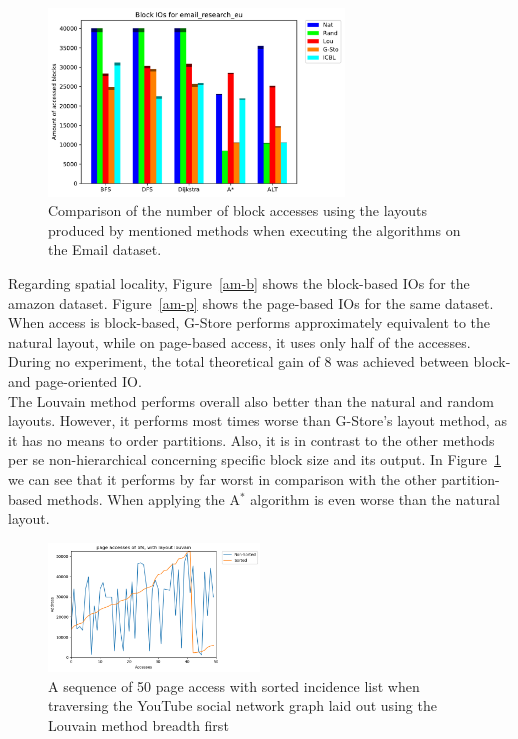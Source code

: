     \begin{figure}[htp]
        \begin{center}
            \includegraphics[keepaspectratio,width=0.7\textwidth]{img/07-eval/email_research_eu_Block_unsorted_io_comparison.pdf}
        \end{center}
        \caption{Comparison of the number of block accesses using the layouts produced by mentioned methods when executing the algorithms on the Email dataset.} 
        \label{email-block}
    \end{figure}
    
    Regarding spatial locality, Figure~\ref{am-b} shows the block-based IOs for the amazon dataset. Figure~\ref{am-p} shows the page-based IOs for the same dataset. When access is block-based, G-Store performs approximately equivalent to the natural layout, while on page-based access, it uses only half of the accesses. During no experiment, the total theoretical gain of 8 was achieved between block- and page-oriented IO. \\
    
    The Louvain method performs overall also better than the natural and random layouts. However, it performs most times worse than G-Store's layout method, as it has no means to order partitions. Also, it is in contrast to the other methods per se non-hierarchical concerning specific block size and its output. In Figure~\ref{email-block} we can see that it performs by far worst in comparison with the other partition-based methods. When applying the A$^*$ algorithm is even worse than the natural layout.
    
      \begin{figure}[htp]
        \begin{center}
            \includegraphics[keepaspectratio,width=0.5\textwidth]{img/07-eval/youtube_louvain_bfs_page_sil_access_seq.png}
        \end{center}
        \caption{A sequence of 50 page access with sorted incidence list when traversing the YouTube social network graph laid out using the Louvain method breadth first} 
        \label{yt-sq}
    \end{figure}
    
